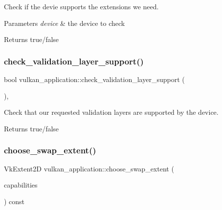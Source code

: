 Check if the devie supports the extensions we need. 


\begin{DoxyParams}{Parameters}
{\em device} & the device to check \\
\hline
\end{DoxyParams}
\begin{DoxyReturn}{Returns}
true/false 
\end{DoxyReturn}
\mbox{\label{classvulkan__application_ab0ebd85ecb91dbfa14def023e17ed09e}} 
\subsubsection{\texorpdfstring{check\+\_\+validation\+\_\+layer\+\_\+support()}{check\_validation\_layer\_support()}}
{\footnotesize\ttfamily bool vulkan\+\_\+application\+::check\+\_\+validation\+\_\+layer\+\_\+support (\begin{DoxyParamCaption}{ }\end{DoxyParamCaption})\hspace{0.3cm}{\ttfamily [static]}, {\ttfamily [private]}}



Check that our requested validation layers are supported by the device. 

\begin{DoxyReturn}{Returns}
true/false 
\end{DoxyReturn}
\mbox{\label{classvulkan__application_a321b970cf84e0539418956dc32b2fe9d}} 
\subsubsection{\texorpdfstring{choose\+\_\+swap\+\_\+extent()}{choose\_swap\_extent()}}
{\footnotesize\ttfamily Vk\+Extent2D vulkan\+\_\+application\+::choose\+\_\+swap\+\_\+extent (\begin{DoxyParamCaption}\item[{const Vk\+Surface\+Capabilities\+K\+HR \&}]{capabilities }\end{DoxyParamCaption}) const\hspace{0.3cm}{\ttfamily [private]}}



